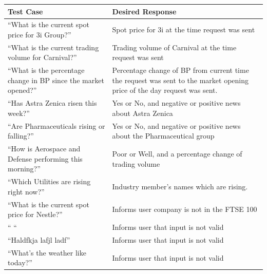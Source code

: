 \documentclass[]{IEEEtran}
\begin{document}
	\begin{table}[h]
	\begin{tabular}{| m{3cm} | m{5cm} | }
		\hline
		
		Test Case & Desired Response \\
		
		\hline
		
		“What is the current spot price for 3i Group?” & Spot price for 3i at the time request was sent \\
		
		\hline
		
		“What is the current trading volume for Carnival?” & Trading volume of Carnival at the time request was sent \\
		
		\hline
		
		“What is the percentage change in BP since the market opened?” & Percentage change of BP from current time the request was sent to the market opening price of the day request was sent. \\
		
		\hline
		
		“Has Astra Zenica risen this week?” & Yes or No, and negative or positive news about Astra Zenica \\
		
		\hline 
		
		“Are Pharmaceuticals rising or falling?” & Yes or No, and negative or positive news about the Pharmaceutical group \\
		
		\hline
		
		“How is Aerospace and Defense performing this morning?” & Poor or Well, and a percentage change of trading volume \\
		
		\hline
		
		“Which Utilities are rising right now?” & Industry member's names which are rising. \\
		
		\hline
		
		“What is the current spot price for Nestle?” & Informs user company is not in the FTSE 100 \\
		
		\hline
		
		“ “ & Informs user that input is not valid \\
		
		\hline
		
		“Haldfkja lafjl ladf” & Informs user that input is not valid \\
		
		\hline 
		
		“What’s the weather like today?” & Informs user that input is not valid \\
		
		\hline
		
		
	\end{tabular}
	\end{table}
	
\end{document}
